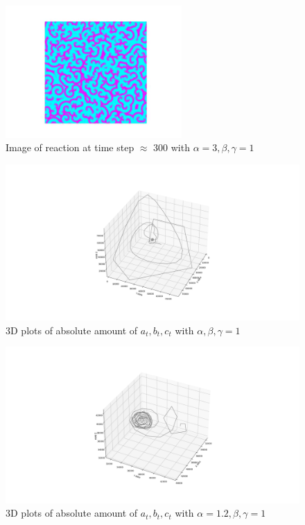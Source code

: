 \documentclass[12pt, A4]{article}
\begin{document}
\begin{figure}[b]
  \begin{center}
    \includegraphics[width=0.6\textwidth]{frame_300_311.png}
  \end{center}
  \caption{Image of reaction at time step $\approx$ 300 with $\alpha=3 ,\beta,\gamma =1$}
  \label{fig:frame_300_311}
\end{figure}


\begin{figure}[b]
  \begin{center}
    \includegraphics[width=1.2\textwidth]{3d.png}
  \end{center}
  \caption{3D plots of absolute amount of $a_t, b_t, c_t$ with $\alpha,\beta,\gamma =1$}
  \label{fig:3d}
\end{figure}

\begin{figure}[b]
  \begin{center}
    \includegraphics[width=1.2\textwidth]{3d2.png}
  \end{center}
  \caption{3D plots of absolute amount of $a_t, b_t, c_t$ with $\alpha=1.2 ,\beta,\gamma =1$}
  \label{fig:3d2}
\end{figure}
\end{document}
